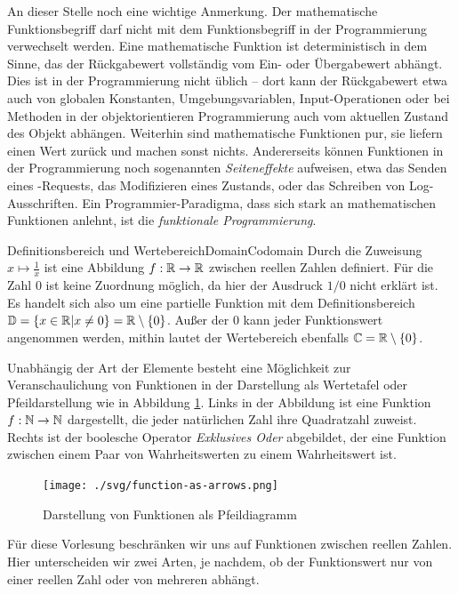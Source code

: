 An dieser Stelle noch eine wichtige Anmerkung. Der mathematische Funktionsbegriff darf nicht mit dem Funktionsbegriff in der Programmierung verwechselt werden. Eine mathematische Funktion ist deterministisch in dem Sinne, das der Rückgabewert vollständig vom Ein- oder Übergabewert abhängt. Dies ist in der Programmierung nicht üblich -- dort kann der Rückgabewert etwa auch von globalen Konstanten, Umgebungsvariablen, Input-Operationen oder bei Methoden in der objektorientieren Programmierung auch vom aktuellen Zustand des Objekt abhängen. Weiterhin sind mathematische Funktionen pur, sie liefern einen Wert zurück und machen sonst nichts. Andererseits können Funktionen in der Programmierung noch sogenannten \emph{Seiteneffekte} aufweisen, etwa das Senden eines -Requests, das Modifizieren eines Zustands, oder das Schreiben von Log-Ausschriften. Ein Programmier-Paradigma, dass sich stark an mathematischen Funktionen anlehnt, ist die \emph{funktionale Programmierung}.

\begin{example}{Definitionsbereich und Wertebereich}{DomainCodomain}
    Durch die Zuweisung $x\mapsto\frac{1}{x}$ ist eine Abbildung $f: \mathbb{R} \to \mathbb{R}$ zwischen reellen Zahlen definiert. Für die Zahl $0$ ist keine Zuordnung möglich, da hier der Ausdruck $1/0$ nicht erklärt ist. Es handelt sich also um eine partielle Funktion mit dem Definitionsbereich $\mathbb{D} = \lbrace x \in \mathbb{R} | x \ne 0 \rbrace = \mathbb{R} \setminus \lbrace 0 \rbrace$. Außer der $0$ kann jeder Funktionswert angenommen werden, mithin lautet der Wertebereich ebenfalls $\mathbb{C} = \mathbb{R} \setminus \lbrace 0 \rbrace$.
\end{example}

Unabhängig der Art der Elemente besteht eine Möglichkeit zur Veranschaulichung von Funktionen in der Darstellung als Wertetafel oder Pfeildarstellung wie in Abbildung \ref{fig:FunAsArrows}. Links in der Abbildung ist eine Funktion $f: \mathbb{N} \to \mathbb{N}$ dargestellt, die jeder natürlichen Zahl ihre Quadratzahl zuweist. Rechts ist der boolesche Operator \emph{Exklusives Oder} abgebildet, der eine Funktion zwischen einem Paar von Wahrheitswerten zu einem Wahrheitswert ist.

\begin{figure}[h]
    \caption{Darstellung von Funktionen als Pfeildiagramm}
    \label{fig:FunAsArrows}
    \centering
    \texttt{[image: ./svg/function-as-arrows.png]}
\end{figure}

Für diese Vorlesung beschränken wir uns auf Funktionen zwischen reellen Zahlen. Hier unterscheiden wir zwei Arten, je nachdem, ob der Funktionswert nur von einer reellen Zahl oder von mehreren abhängt.


